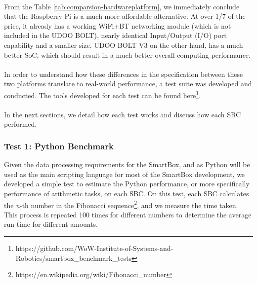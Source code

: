 \paragraph{} From the Table \ref{tab:comparsion-hardwareplatform}, we immediately conclude that the Raspberry Pi is a much more affordable alternative. At over 1/7 of the price, it already has a working WiFi+BT networking module (which is not included in the UDOO BOLT), nearly identical Input/Output (I/O) port capability and a smaller size. UDOO BOLT V3 on the other hand, has a much better SoC, which should result in a much better overall computing performance.


\paragraph{} In order to understand how these differences in the specification between these two platforms translate to real-world performance, a test suite was developed and conducted. The tools developed for each test can be found here\footnote{https://github.com/WoW-Institute-of-Systems-and-Robotics/smartbox\_benchmark\_tests}. 

\paragraph{}In the next sections, we detail how each test works and discuss how each \acs{SBC} performed. 


\subsubsection{Test 1: Python Benchmark}

Given the data processing requirements for the SmartBox, and as Python will be used as the main scripting language for most of the SmartBox development, we developed a simple test to estimate the Python performance, or more specifically performance of arithmetic tasks, on each \acs{SBC}. On this test, each \acs{SBC} calculates the \textit{n}-th number in the Fibonacci sequence\footnote{https://en.wikipedia.org/wiki/Fibonacci\_number}, and we measure the time taken. This process is repeated 100 times for different numbers to determine the average run time for different amounts.

